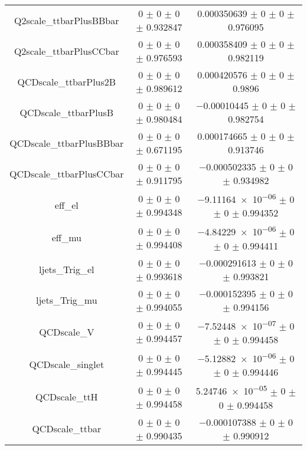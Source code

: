 \begin{table}
\begin{tabular}{ccc}
Q2scale\_ttbarPlusBBbar & \num{0} $\pm$ \num{0} $\pm$ \num{0} $\pm$ \num{0.932847} & \num{0.000350639} $\pm$ \num{0} $\pm$ \num{0} $\pm$ \num{0.976095}\\
Q2scale\_ttbarPlusCCbar & \num{0} $\pm$ \num{0} $\pm$ \num{0} $\pm$ \num{0.976593} & \num{0.000358409} $\pm$ \num{0} $\pm$ \num{0} $\pm$ \num{0.982119}\\
QCDscale\_ttbarPlus2B & \num{0} $\pm$ \num{0} $\pm$ \num{0} $\pm$ \num{0.989612} & \num{0.000420576} $\pm$ \num{0} $\pm$ \num{0} $\pm$ \num{0.9896}\\
QCDscale\_ttbarPlusB & \num{0} $\pm$ \num{0} $\pm$ \num{0} $\pm$ \num{0.980484} & \num{-0.00010445} $\pm$ \num{0} $\pm$ \num{0} $\pm$ \num{0.982754}\\
QCDscale\_ttbarPlusBBbar & \num{0} $\pm$ \num{0} $\pm$ \num{0} $\pm$ \num{0.671195} & \num{0.000174665} $\pm$ \num{0} $\pm$ \num{0} $\pm$ \num{0.913746}\\
QCDscale\_ttbarPlusCCbar & \num{0} $\pm$ \num{0} $\pm$ \num{0} $\pm$ \num{0.911795} & \num{-0.000502335} $\pm$ \num{0} $\pm$ \num{0} $\pm$ \num{0.934982}\\
eff\_el & \num{0} $\pm$ \num{0} $\pm$ \num{0} $\pm$ \num{0.994348} & \num{-9.11164e-06} $\pm$ \num{0} $\pm$ \num{0} $\pm$ \num{0.994352}\\
eff\_mu & \num{0} $\pm$ \num{0} $\pm$ \num{0} $\pm$ \num{0.994408} & \num{-4.84229e-06} $\pm$ \num{0} $\pm$ \num{0} $\pm$ \num{0.994411}\\
ljets\_Trig\_el & \num{0} $\pm$ \num{0} $\pm$ \num{0} $\pm$ \num{0.993618} & \num{-0.000291613} $\pm$ \num{0} $\pm$ \num{0} $\pm$ \num{0.993821}\\
ljets\_Trig\_mu & \num{0} $\pm$ \num{0} $\pm$ \num{0} $\pm$ \num{0.994055} & \num{-0.000152395} $\pm$ \num{0} $\pm$ \num{0} $\pm$ \num{0.994156}\\
QCDscale\_V & \num{0} $\pm$ \num{0} $\pm$ \num{0} $\pm$ \num{0.994457} & \num{-7.52448e-07} $\pm$ \num{0} $\pm$ \num{0} $\pm$ \num{0.994458}\\
QCDscale\_singlet & \num{0} $\pm$ \num{0} $\pm$ \num{0} $\pm$ \num{0.994445} & \num{-5.12882e-06} $\pm$ \num{0} $\pm$ \num{0} $\pm$ \num{0.994446}\\
QCDscale\_ttH & \num{0} $\pm$ \num{0} $\pm$ \num{0} $\pm$ \num{0.994458} & \num{5.24746e-05} $\pm$ \num{0} $\pm$ \num{0} $\pm$ \num{0.994458}\\
QCDscale\_ttbar & \num{0} $\pm$ \num{0} $\pm$ \num{0} $\pm$ \num{0.990435} & \num{-0.000107388} $\pm$ \num{0} $\pm$ \num{0} $\pm$ \num{0.990912}\\

\end{tabular}
\end{table}
